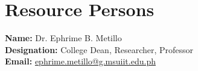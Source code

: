 \chapter{Resource Persons}

\textbf{Name:} Dr. Ephrime B. Metillo\\
\textbf{Designation:} College Dean, Researcher, Professor\\
\textbf{Email:} \href{mailto:ephrime.metillo@g.msuiit.edu.ph}{ephrime.metillo@g.msuiit.edu.ph}
